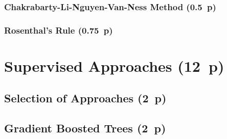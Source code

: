 \begin{algorithm}


  \caption{$\operatorname{\mathtt{emo}}$ \label{alg:emo-rule}}


  \BlankLine %

\end{algorithm}

\subsubsection{Chakrabarty-Li-Nguyen-Van-Ness
  Method (0.5~p)}\label{chakarabarty-li-nguyen-van-ness-method}

\subsubsection{Rosenthal's Rule (0.75~p)}\label{rosenthals-rule}

\newpage
\section{Supervised Approaches (12~p)}\label{supervised-approaches}

\subsection{Selection of Approaches (2~p)}\label{selection-of-approaches}

\subsection{Gradient Boosted Trees (2~p)}\label{gradient-boosted-trees}

